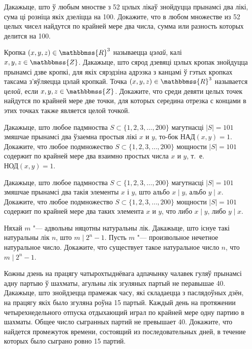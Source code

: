 \documentclass[12pt, a4paper]{article}
\begin{document}

\begin{problemList}

\problemItemSimple
{Дакажыце, што ў любым мностве з 52 цэлых лікаў знойдуцца прынамсі два лікі, сума ці розніца якіх дзеліцца на 100.}
{Докажите, что в любом множестве из 52 целых чисел найдутся по крайней мере два числа, сумма или разность которых делится на 100.}

\bigskip

\problemItemSimple
{Кропка $(x, y, z) \in \mathbbmss{R}^3$ называецца \emph{цэлай}, калі $x, y, z \in \mathbbmss{Z}$. Дакажыце, што сярод дзевяці цэлых кропак знойдуцца прынамсі дзве кропкі, для якіх сярэдзіна адрэзка з канцамі ў гэтых кропках таксама з'яўляецца цэлай кропкай.}
{Точка $(x, y, z) \in \mathbbmss{R}^3$ называется \emph{целой}, если $x, y, z \in \mathbbmss{Z}$. Докажите, что среди девяти целых точек найдутся по крайней мере две точки, для которых середина отрезка с концами в этих точках также является целой точкой.}

\bigskip

\problemItemSimple
{Дакажыце, што любое падмноства $S \subset \{1, 2, 3, \ldots, 200\}$ магутнасці $|S| = 101$ змяшчае прынамсі два ўзаемна простыя лікі $x$ и $y$, то-бок $\text{НАД}(x, y) = 1$.}
{Докажите, что любое подмножество $S \subset \{1, 2, 3, \ldots, 200\}$ мощности $|S| = 101$ содержит по крайней мере два взаимно простых числа $x$ и $y$, т.~е. $\text{НОД}(x, y) = 1$.}

\bigskip

\problemItemSimple
{Дакажыце, што любое падмноства $S \subset \{1, 2, 3, \ldots, 200\}$ магутнасці $|S| = 101$ змяшчае прынамсі два такія элементы $x$ і $y$, што альбо $x \mid y$, альбо $y \mid x$.}
{Докажите, что любое подмножество $S \subset \{1, 2, 3, \ldots, 200\}$ мощности $|S| = 101$ содержит по крайней мере два таких элемента $x$ и $y$, что либо $x \mid y$, либо $y \mid x$.}

\bigskip

\problemItemSimple
{Няхай $m$ "--- адвольны няцотны натуральны лік. Дакажыце, што існуе такі натуральны лік $n$, што $m \mid 2^n - 1$.}
{Пусть $m$ "--- произвольное нечетное натуральное число. Докажите, что существует такое натуральное число $n$, что $m \mid 2^n - 1$.}

\bigskip

\problemItemSimple
{Кожны дзень на працягу чатырохтыднёвага адпачынку чалавек гуляў прынамсі адну партыю ў шахматы, агульны лік згуляных партый не перавышае 40. Дакажыце, што знойдзецца прамежак часу, які складаецца з паслядоўных дзён, на працягу якіх было згуляна роўна 15 партый.}
{Каждый день на протяжении четырехнедельного отпуска отдыхающий играл
по крайней мере одну партию в шахматы. Общее число сыгранных партий не
превышает 40. Докажите, что найдется промежуток времени, состоящий из
последовательных дней, в течение которых было сыграно ровно 15 партий.}

\end{problemList}
\end{document}
